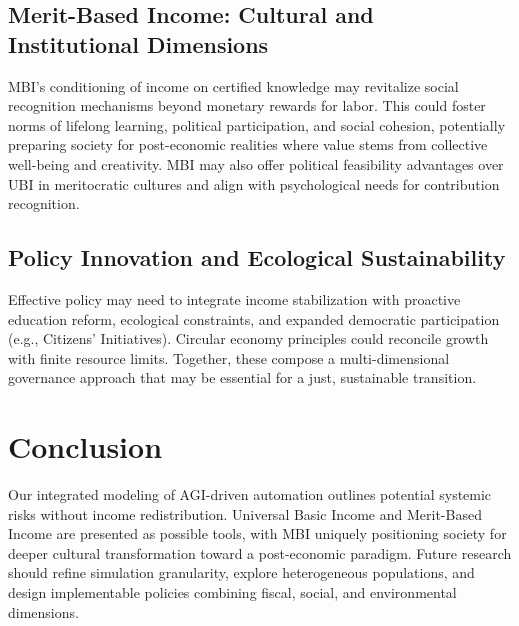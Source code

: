 \documentclass[10pt,a4paper]{article}
\begin{document}
\subsection{Merit-Based Income: Cultural and Institutional Dimensions}
MBI’s conditioning of income on certified knowledge may revitalize social recognition mechanisms beyond monetary rewards for labor. This could foster norms of lifelong learning, political participation, and social cohesion, potentially preparing society for post-economic realities where value stems from collective well-being and creativity. MBI may also offer political feasibility advantages over UBI in meritocratic cultures and align with psychological needs for contribution recognition.

\subsection{Policy Innovation and Ecological Sustainability}
Effective policy may need to integrate income stabilization with proactive education reform, ecological constraints, and expanded democratic participation (e.g., Citizens’ Initiatives). Circular economy principles could reconcile growth with finite resource limits. Together, these compose a multi-dimensional governance approach that may be essential for a just, sustainable transition.

\section{Conclusion}
Our integrated modeling of AGI-driven automation outlines potential systemic risks without income redistribution. Universal Basic Income and Merit-Based Income are presented as possible tools, with MBI uniquely positioning society for deeper cultural transformation toward a post-economic paradigm. Future research should refine simulation granularity, explore heterogeneous populations, and design implementable policies combining fiscal, social, and environmental dimensions.



\end{document}
